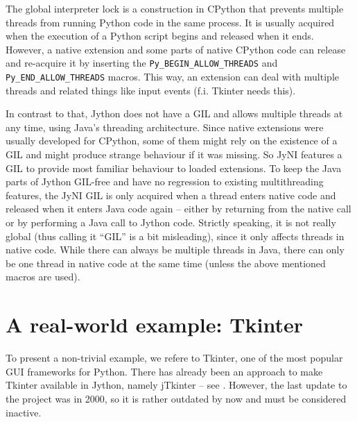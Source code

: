 \documentclass[letterpaper,compsoc,twoside]{IEEEtran}
\begin{document}
The global interpreter lock is a construction in CPython that prevents multiple threads from running Python code in the same process. It is usually acquired when the execution of a Python script begins and released when it ends. However, a native extension and some parts of native CPython code can release and re-acquire it by inserting the \texttt{Py\_BEGIN\_ALLOW\_THREADS} and \texttt{Py\_END\_ALLOW\_THREADS} macros. This way, an extension can deal with multiple threads and related things like input events (f.i. Tkinter needs this).

In contrast to that, Jython does not have a GIL and allows multiple threads at any time, using Java's threading architecture. Since native extensions were usually developed for CPython, some of them might rely on the existence of a GIL and might produce strange behaviour if it was missing. So JyNI features a GIL to provide most familiar behaviour to loaded extensions. To keep the Java parts of Jython GIL-free and have no regression to existing multithreading features, the JyNI GIL is only acquired when a thread enters native code and released when it enters Java code again – either by returning from the native call or by performing a Java call to Jython code. Strictly speaking, it is not really global (thus calling it “GIL” is a bit misleading), since it only affects threads in native code. While there can always be multiple threads in Java, there can only be one thread in native code at the same time (unless the above mentioned macros are used).

\section{A real-world example: Tkinter\label{a-real-world-example-tkinter}}


To present a non-trivial example, we refere to Tkinter, one of the most popular GUI frameworks for Python.
There has already been an approach to make Tkinter available in Jython, namely jTkinter – see \cite{JTK}. However,
the last update to the project was in 2000, so it is rather outdated by now and must be considered inactive.
\end{document}
